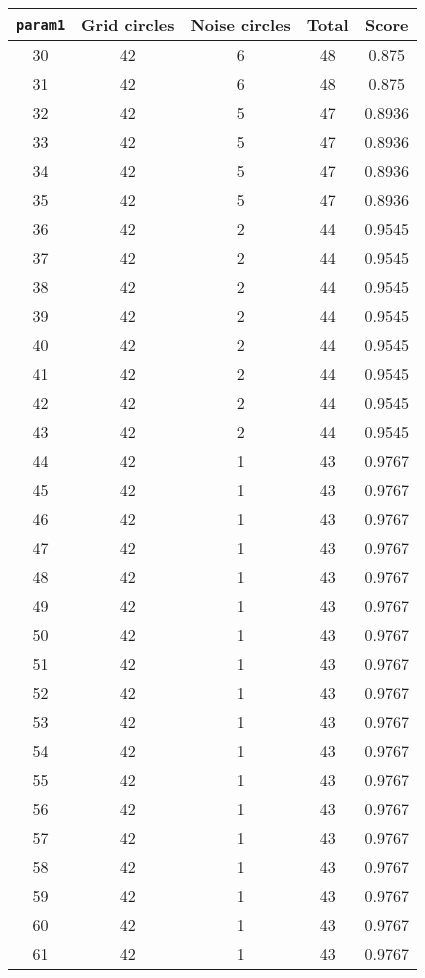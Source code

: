 \documentclass[letterpaper, 12pt]{article}
\begin{document}
\begin{longtable}{|c|c|c|c|c|}
\hline
\textbf{\texttt{param1}} & \textbf{Grid circles} & \textbf{Noise circles} & \textbf{Total} & \textbf{Score} \\
\hline
30 & 42 & 6 & 48 & 0.875 \\
\hline
31 & 42 & 6 & 48 & 0.875 \\
\hline
32 & 42 & 5 & 47 & 0.8936 \\
\hline
33 & 42 & 5 & 47 & 0.8936 \\
\hline
34 & 42 & 5 & 47 & 0.8936 \\
\hline
35 & 42 & 5 & 47 & 0.8936 \\
\hline
36 & 42 & 2 & 44 & 0.9545 \\
\hline
37 & 42 & 2 & 44 & 0.9545 \\
\hline
38 & 42 & 2 & 44 & 0.9545 \\
\hline
39 & 42 & 2 & 44 & 0.9545 \\
\hline
40 & 42 & 2 & 44 & 0.9545 \\
\hline
41 & 42 & 2 & 44 & 0.9545 \\
\hline
42 & 42 & 2 & 44 & 0.9545 \\
\hline
43 & 42 & 2 & 44 & 0.9545 \\
\hline
44 & 42 & 1 & 43 & 0.9767 \\
\hline
45 & 42 & 1 & 43 & 0.9767 \\
\hline
46 & 42 & 1 & 43 & 0.9767 \\
\hline
47 & 42 & 1 & 43 & 0.9767 \\
\hline
48 & 42 & 1 & 43 & 0.9767 \\
\hline
49 & 42 & 1 & 43 & 0.9767 \\
\hline
50 & 42 & 1 & 43 & 0.9767 \\
\hline
51 & 42 & 1 & 43 & 0.9767 \\
\hline
52 & 42 & 1 & 43 & 0.9767 \\
\hline
53 & 42 & 1 & 43 & 0.9767 \\
\hline
54 & 42 & 1 & 43 & 0.9767 \\
\hline
55 & 42 & 1 & 43 & 0.9767 \\
\hline
56 & 42 & 1 & 43 & 0.9767 \\
\hline
57 & 42 & 1 & 43 & 0.9767 \\
\hline
58 & 42 & 1 & 43 & 0.9767 \\
\hline
59 & 42 & 1 & 43 & 0.9767 \\
\hline
60 & 42 & 1 & 43 & 0.9767 \\
\hline
61 & 42 & 1 & 43 & 0.9767 \\

\end{longtable}
\end{document}

